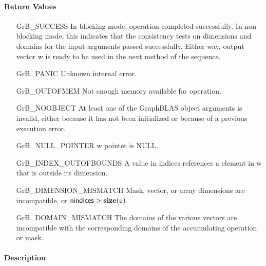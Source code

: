 \paragraph{Return Values}

\begin{itemize}[leftmargin=2.1in]
    \item[{\sf GrB\_SUCCESS}]         In blocking mode, operation
	completed successfully. In non-blocking mode, this indicates
	that the consistency tests on dimensions and domains for the
	input arguments passed successfully. Either way, output vector
	{\sf w} is ready to be used in the next method of the sequence.

    \item[{\sf GrB\_PANIC}]           Unknown internal error.
    
    \item[{\sf GrB\_OUTOFMEM}]        Not enough memory available for operation.
    
    \item[{\sf GrB\_NOOBJECT}]        At least one of the GraphBLAS object arguments is invalid, either because it has
    not been initialized or because of a previous execution error.
    
    \item[{\sf GrB\_NULL\_POINTER}]  {\sf w} pointer is {\sf NULL}.

    \item[{\sf GrB\_INDEX\_OUTOFBOUNDS}]  A value in {\sf indices} references a 
    element in {\sf w} that is outside its dimension.
    
    \item[{\sf GrB\_DIMENSION\_MISMATCH}] Mask, vector, or array dimensions are
    incompatible, or ${\sf nindices} > \bold{size}({\sf u})$. 
    
    \item[{\sf GrB\_DOMAIN\_MISMATCH}]    The domains of the various
	vectors are incompatible with the corresponding domains of the
	accumulating operation or mask.
\end{itemize}

\paragraph{Description}

